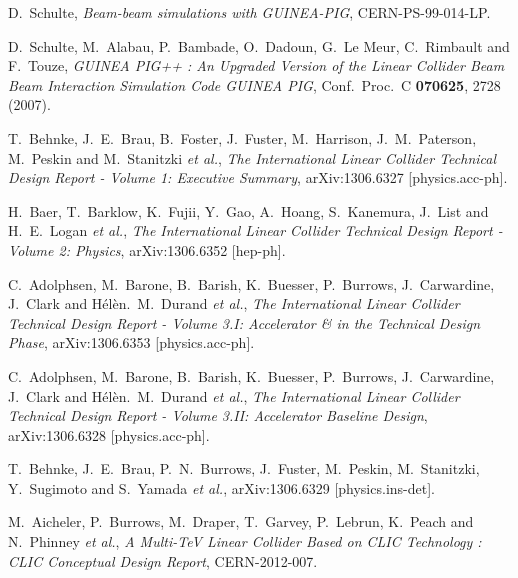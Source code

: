 \documentclass[12pt]{book}
\begin{document}
\begin{thebibliography}{19}
  D.~Schulte,
  {\em Beam-beam simulations with GUINEA-PIG},
  CERN-PS-99-014-LP.

  D.~Schulte, M.~Alabau, P.~Bambade, O.~Dadoun, G.~Le Meur, C.~Rimbault and F.~Touze,
  {\em GUINEA PIG++ : An Upgraded Version of the Linear Collider Beam
    Beam Interaction Simulation Code GUINEA PIG},
  Conf.\ Proc.\ C {\bf 070625}, 2728 (2007).

  T.~Behnke, J.~E.~Brau, B.~Foster, J.~Fuster, M.~Harrison, J.~M.~Paterson, M.~Peskin and M.~Stanitzki {\it et al.},
  {\em The International Linear Collider Technical Design Report -
    Volume 1: Executive Summary},
  arXiv:1306.6327 [physics.acc-ph].

  H.~Baer, T.~Barklow, K.~Fujii, Y.~Gao, A.~Hoang, S.~Kanemura, J.~List and H.~E.~Logan {\it et al.},
  {\em The International Linear Collider Technical Design Report -
    Volume 2: Physics},
  arXiv:1306.6352 [hep-ph].

  C.~Adolphsen, M.~Barone, B.~Barish, K.~Buesser, P.~Burrows, J.~Carwardine, J.~Clark and H\'{e}l\`{e}n.~M.~Durand {\it et al.},
  {\em The International Linear Collider Technical Design Report -
    Volume 3.I: Accelerator \& in the Technical Design Phase},
  arXiv:1306.6353 [physics.acc-ph].

  C.~Adolphsen, M.~Barone, B.~Barish, K.~Buesser, P.~Burrows, J.~Carwardine, J.~Clark and H\'{e}l\`{e}n.~M.~Durand {\it et al.},
  {\em The International Linear Collider Technical Design Report -
    Volume 3.II: Accelerator Baseline Design},
  arXiv:1306.6328 [physics.acc-ph].

  T.~Behnke, J.~E.~Brau, P.~N.~Burrows, J.~Fuster, M.~Peskin, M.~Stanitzki, Y.~Sugimoto and S.~Yamada {\it et al.},
  arXiv:1306.6329 [physics.ins-det].

  M.~Aicheler, P.~Burrows, M.~Draper, T.~Garvey, P.~Lebrun, K.~Peach and N.~Phinney {\it et al.},
  {\em A Multi-TeV Linear Collider Based on CLIC Technology : CLIC
    Conceptual Design Report},
  CERN-2012-007.


\end{thebibliography}
\end{document}
